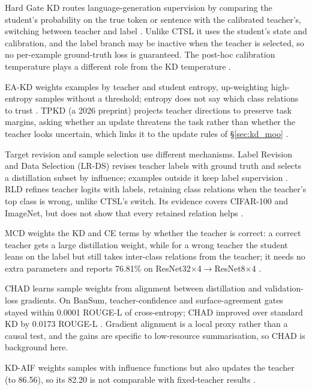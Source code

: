 Hard Gate KD routes language-generation supervision by comparing the student's probability on the true token or sentence with the calibrated teacher's, switching between teacher and label \citep{lee2022hardgatekd}. Unlike CTSL it uses the student's state and calibration, and the label branch may be inactive when the teacher is selected, so no per-example ground-truth loss is guaranteed. The post-hoc calibration temperature plays a different role from the KD temperature \citep{guo2017calibration}.

EA-KD weights examples by teacher and student entropy, up-weighting high-entropy samples without a threshold; entropy does not say which class relations to trust \citep{su2025eakd}. TPKD (a 2026 preprint) projects teacher directions to preserve task margins, asking whether an update threatens the task rather than whether the teacher looks uncertain, which links it to the update rules of \S\ref{sec:kd_moo} \citep{yuan2026tpkd}.

Target revision and sample selection use different mechanisms. Label Revision and Data Selection (LR-DS) revises teacher labels with ground truth and selects a distillation subset by influence; examples outside it keep label supervision \citep{lan2025labelrevision}. RLD refines teacher logits with labels, retaining class relations when the teacher's top class is wrong, unlike CTSL's switch. Its evidence covers CIFAR-100 and ImageNet, but does not show that every retained relation helps \citep{sun2025rld}.

MCD weights the KD and CE terms by whether the teacher is correct: a correct teacher gets a large distillation weight, while for a wrong teacher the student leans on the label but still takes inter-class relations from the teacher; it needs no extra parameters and reports 76.81\% on ResNet32$\times$4$\to$ResNet8$\times$4 \citep{mishra2026mcd}.

CHAD learns sample weights from alignment between distillation and validation-loss gradients. On BanSum, teacher-confidence and surface-agreement gates stayed within 0.0001 ROUGE-L of cross-entropy; CHAD improved over standard KD by 0.0173 ROUGE-L \citep{sumit2026chad}. %
Gradient alignment is a local proxy rather than a causal test, and the gains are specific to low-resource summarisation, so CHAD is background here.

KD-AIF weights samples with influence functions but also updates the teacher (to 86.56), so its 82.20 is not comparable with fixed-teacher results \citep{wu2025kdaif}. %

